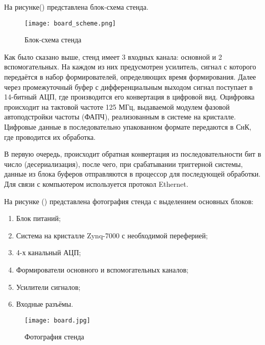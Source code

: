 На рисунке() представлена блок-схема стенда.\par
\begin{figure}[ht]
    \centering
    \texttt{[image: board\_scheme.png]}
    \caption{Блок-схема стенда}
    \label{fig:mpr}
\end{figure}
Как было сказано выше, стенд имеет 3 входных канала: основной и 2 вспомогательных. На каждом из них предусмотрен усилитель, сигнал с которого передаётся в набор формирователей, определяющих время формирования. Далее через промежуточный буфер с дифференциальным выходом сигнал поступает в 14-битный АЦП, где производится его конвертация в цифровой вид. Оцифровка происходит на тактовой частоте 125 МГц, выдаваемой модулем фазовой автоподстройки частоты (ФАПЧ), реализованным в системе на кристалле. Цифровые данные в последовательно упакованном формате передаются в СнК, где проводится их обработка.\par
В первую очередь, происходит обратная конвертация из последовательности бит в число (десериализация), после чего, при срабатывании триггерной системы, данные из блока буферов отправляются в процессор для последующей обработки. Для связи с компьютером используется протокол Ethernet.\par

На рисунке () представлена фотография стенда с выделением основных блоков:\par
\begin{enumerate}
    \item Блок питаний;
    \item Система на кристалле Zynq-7000 с необходимой переферией;
    \item 4-х канальный АЦП;
    \item Формирователи основного и вспомогательных каналов;
    \item Усилители сигналов;
    \item Входные разъёмы. 
\end{enumerate}

\begin{figure}[ht]
    \centering
    \texttt{[image: board.jpg]}
    \caption{Фотография стенда}
    \label{fig:mpr}
\end{figure}

